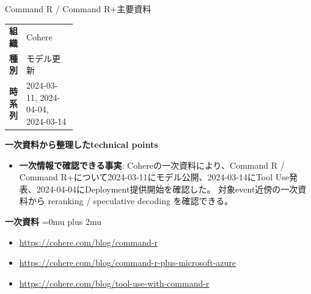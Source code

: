 \begin{technicalnote}{Command R / Command R+}{主要資料}
\begingroup
\begin{tabularx}{\linewidth}{@{}>{\bfseries}p{0.22\linewidth}X@{}}
組織 & Cohere \\
種別 & モデル更新 \\
時系列 & 2024-03-11, 2024-04-04, 2024-03-14 \\
\end{tabularx}
\smallskip
\begin{minipage}{\linewidth}
{\bfseries 一次資料から整理したtechnical points}
\begin{itemize}[leftmargin=1.5em,itemsep=0.35em]
\item \textbf{一次情報で確認できる事実}: Cohereの一次資料により、Command R / Command R+について2024-03-11にモデル公開、2024-03-14にTool Use発表、2024-04-04にDeployment提供開始を確認した。 対象event近傍の一次資料から reranking / speculative decoding を確認できる。
\end{itemize}
\begin{minipage}{\linewidth}
\begin{samepage}
{\bfseries 一次資料}
\begingroup\sloppy
\Urlmuskip=0mu plus 2mu\relax
\begin{itemize}[leftmargin=1.5em,itemsep=0.25em]
\item {\scriptsize\url{https://cohere.com/blog/command-r}}
\item {\scriptsize\url{https://cohere.com/blog/command-r-plus-microsoft-azure}}
\item {\scriptsize\url{https://cohere.com/blog/tool-use-with-command-r}}
\end{itemize}
\endgroup
\end{samepage}
\end{minipage}
\end{minipage}
\endgroup
\end{technicalnote}
\medskip

